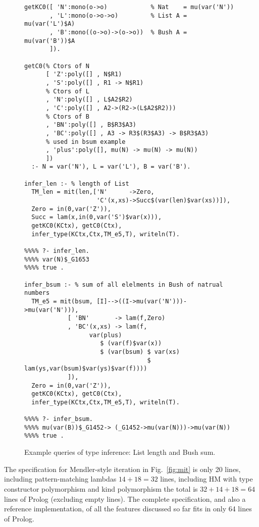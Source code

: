 \documentclass[runningheads,a4paper]{llncs}
\newcommand{\TODO}[1]{\textcolor{magenta}{TODO: #1}}
\begin{document}
\begin{figure}\small
\begin{verbatim}
getKC0([ 'N':mono(o->o)            % Nat    = mu(var('N'))
       , 'L':mono(o->o->o)         % List A = mu(var('L')$A)
       , 'B':mono((o->o)->(o->o))  % Bush A = mu(var('B'))$A
       ]).

getC0(% Ctors of N
      [ 'Z':poly([] , N$R1)
      , 'S':poly([] , R1 -> N$R1)
      % Ctors of L
      , 'N':poly([] , L$A2$R2)
      , 'C':poly([] , A2->(R2->(L$A2$R2)))
      % Ctors of B
      , 'BN':poly([] , B$R3$A3)
      , 'BC':poly([] , A3 -> R3$(R3$A3) -> B$R3$A3)
      % used in bsum example
      , 'plus':poly([], mu(N) -> mu(N) -> mu(N))
      ])
  :- N = var('N'), L = var('L'), B = var('B').

infer_len :- % length of List
  TM_len = mit(len,['N'      ->Zero,
                    'C'(x,xs)->Succ$(var(len)$var(xs))]),
  Zero = in(0,var('Z')),
  Succ = lam(x,in(0,var('S')$var(x))),
  getKC0(KCtx), getC0(Ctx),
  infer_type(KCtx,Ctx,TM_e5,T), writeln(T).

%%%% ?- infer_len.
%%%% var(N)$_G1653
%%%% true .

infer_bsum :- % sum of all elelments in Bush of natrual numbers
  TM_e5 = mit(bsum, [I]-->((I->mu(var('N')))->mu(var('N'))),
            [ 'BN'       -> lam(f,Zero)
            , 'BC'(x,xs) -> lam(f,
                  var(plus)
                     $ (var(f)$var(x))
                     $ (var(bsum) $ var(xs)
                                  $ lam(ys,var(bsum)$var(ys)$var(f))))
            ]),
  Zero = in(0,var('Z')),
  getKC0(KCtx), getC0(Ctx),
  infer_type(KCtx,Ctx,TM_e5,T), writeln(T).

%%%% ?- infer_bsum.
%%%% mu(var(B))$_G1452-> (_G1452->mu(var(N)))->mu(var(N))
%%%% true .
\end{verbatim}
\caption{Example queries of type inference: List length and Bush sum.}
\label{fig:TIexample}
\end{figure}


The specification for Mendler-style iteration in Fig.~\ref{fig:mit}
is only 20 lines, including pattern-matching lambdas $14+18=32$ lines,
including HM with type constructor polymorphism and kind polymorphism
the total is $32+14+18=64$ lines of Prolog (excluding empty lines).
The complete specification, and also a reference implementation, of
all the features discussed so far fits in only 64 lines of Prolog.
\end{document}
